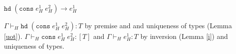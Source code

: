 \begin{case}
$\mathtt{hd}\;(\mathtt{cons}\;e_{H}^{1}\;e_{H}^{2})\rightarrow e_{H}^{1}$

$\Gamma\vdash_{H}\mathtt{hd}\;(\mathtt{cons}\;e_{H}^{1}\;e_{H}^{2}):T$ by premise and and uniqueness of types (Lemma \ref{uot}).  $\Gamma\vdash_{H}\mathtt{cons}\;e_{H}^{1}\;e_{H}^{2}:[T]$ and $\Gamma\vdash_{H}e_{H}^{1}:T$ by inversion (Lemma \ref{i}) and uniqueness of types.
\end{case}